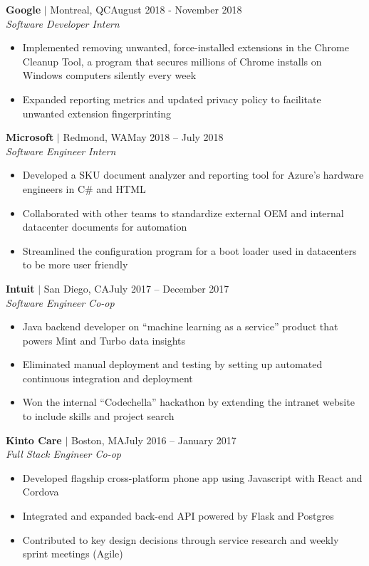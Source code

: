 \documentclass[overlapped,line]{res}
\begin{document}
\begin{resume}
\textbf{Google} $|$ Montreal, QC\hfill August 2018 - November 2018\\
{\sl Software Developer Intern}
\begin{itemize}
	\item Implemented removing unwanted, force-installed extensions in the Chrome Cleanup Tool, a program that secures millions of Chrome installs on Windows computers silently every week
	\item Expanded reporting metrics and updated privacy policy to facilitate unwanted extension fingerprinting
\end{itemize}

\textbf{Microsoft} $|$ Redmond, WA\hfill May 2018 \--- July 2018\\
{\sl Software Engineer Intern}
\begin{itemize} \itemsep -2pt
	\item Developed a SKU document analyzer and reporting tool for Azure's hardware engineers in C\# and HTML
	\item Collaborated with other teams to standardize external OEM and internal datacenter documents for automation
	\item Streamlined the configuration program for a boot loader used in datacenters to be more user friendly
\end{itemize}

\textbf{Intuit} $|$ San Diego, CA\hfill July 2017 \--- December 2017\\
{\sl Software Engineer Co-op}
\begin{itemize} \itemsep -2pt
	\item Java backend developer on ``machine learning as a service'' product that powers Mint and Turbo data insights
	\item Eliminated manual deployment and testing by setting up automated continuous integration and deployment
	\item Won the internal ``Codechella'' hackathon by extending the intranet website to include skills and project search
\end{itemize}

\textbf{Kinto Care} $|$ Boston, MA\hfill July 2016 \--- January 2017\\
{\sl Full Stack Engineer Co-op}
\begin{itemize} \itemsep -2pt
	\item Developed flagship cross-platform phone app using Javascript with React and Cordova
	\item Integrated and expanded back-end API powered by Flask and Postgres
	\item Contributed to key design decisions through service research and weekly sprint meetings (Agile)
\end{itemize}


\end{resume}
\end{document}
